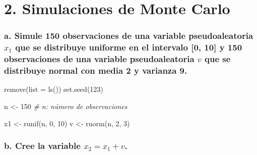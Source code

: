 \documentclass[
]{article}
\newenvironment{Shaded}{\begin{snugshade}}{\end{snugshade}}
\newcommand{\AttributeTok}[1]{\textcolor[rgb]{0.77,0.63,0.00}{#1}}
\newcommand{\CommentTok}[1]{\textcolor[rgb]{0.56,0.35,0.01}{\textit{#1}}}
\newcommand{\DecValTok}[1]{\textcolor[rgb]{0.00,0.00,0.81}{#1}}
\newcommand{\FunctionTok}[1]{\textcolor[rgb]{0.00,0.00,0.00}{#1}}
\newcommand{\NormalTok}[1]{#1}
\newcommand{\OtherTok}[1]{\textcolor[rgb]{0.56,0.35,0.01}{#1}}
\begin{document}
\hypertarget{simulaciones-de-monte-carlo}{%
\section{2. Simulaciones de Monte
Carlo}\label{simulaciones-de-monte-carlo}}

\hypertarget{a.-simule-150-observaciones-de-una-variable-pseudoaleatoria-x_1-que-se-distribuye-uniforme-en-el-intervalo-0-10-y-150-observaciones-de-una-variable-pseudoaleatoria-v-que-se-distribuye-normal-con-media-2-y-varianza-9.}{%
\subsubsection{\texorpdfstring{a. Simule 150 observaciones de una
variable pseudoaleatoria \(x_{1}\) que se distribuye uniforme en el
intervalo {[}0, 10{]} y 150 observaciones de una variable
pseudoaleatoria \(v\) que se distribuye normal con media 2 y varianza
9.}{a. Simule 150 observaciones de una variable pseudoaleatoria x\_\{1\} que se distribuye uniforme en el intervalo {[}0, 10{]} y 150 observaciones de una variable pseudoaleatoria v que se distribuye normal con media 2 y varianza 9.}}\label{a.-simule-150-observaciones-de-una-variable-pseudoaleatoria-x_1-que-se-distribuye-uniforme-en-el-intervalo-0-10-y-150-observaciones-de-una-variable-pseudoaleatoria-v-que-se-distribuye-normal-con-media-2-y-varianza-9.}}

\begin{Shaded}
\begin{Highlighting}[]
\FunctionTok{remove}\NormalTok{(}\AttributeTok{list =} \FunctionTok{ls}\NormalTok{())}
\FunctionTok{set.seed}\NormalTok{(}\DecValTok{123}\NormalTok{)}

\NormalTok{n }\OtherTok{\textless{}{-}} \DecValTok{150}   \CommentTok{\# n: número de observaciones}

\NormalTok{x1 }\OtherTok{\textless{}{-}} \FunctionTok{runif}\NormalTok{(n, }\DecValTok{0}\NormalTok{, }\DecValTok{10}\NormalTok{)}
\NormalTok{v }\OtherTok{\textless{}{-}} \FunctionTok{rnorm}\NormalTok{(n, }\DecValTok{2}\NormalTok{, }\DecValTok{3}\NormalTok{)}
\end{Highlighting}
\end{Shaded}

\hypertarget{b.-cree-la-variable-x_2-x_1-v.}{%
\subsubsection{\texorpdfstring{b. Cree la variable
\(x_{2} = x_{1} + v\).}{b. Cree la variable x\_\{2\} = x\_\{1\} + v.}}\label{b.-cree-la-variable-x_2-x_1-v.}}
\end{document}
